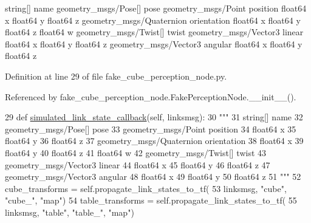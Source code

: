 \begin{DoxyVerb}string[] name
geometry_msgs/Pose[] pose
  geometry_msgs/Point position
    float64 x
    float64 y
    float64 z
  geometry_msgs/Quaternion orientation
    float64 x
    float64 y
    float64 z
    float64 w
geometry_msgs/Twist[] twist
  geometry_msgs/Vector3 linear
    float64 x
    float64 y
    float64 z
  geometry_msgs/Vector3 angular
    float64 x
    float64 y
    float64 z
\end{DoxyVerb}
 

Definition at line 29 of file fake\+\_\+cube\+\_\+perception\+\_\+node.\+py.



Referenced by fake\+\_\+cube\+\_\+perception\+\_\+node.\+Fake\+Perception\+Node.\+\_\+\+\_\+init\+\_\+\+\_\+().


\begin{DoxyCode}
29     \textcolor{keyword}{def }\hyperlink{classfake__cube__perception__node_1_1FakePerceptionNode_ac1127eae8d2eda994b22873529bd198f}{simulated\_link\_state\_callback}(self, linksmsg):
30         \textcolor{stringliteral}{"""}
31 \textcolor{stringliteral}{        string[] name}
32 \textcolor{stringliteral}{        geometry\_msgs/Pose[] pose}
33 \textcolor{stringliteral}{          geometry\_msgs/Point position}
34 \textcolor{stringliteral}{            float64 x}
35 \textcolor{stringliteral}{            float64 y}
36 \textcolor{stringliteral}{            float64 z}
37 \textcolor{stringliteral}{          geometry\_msgs/Quaternion orientation}
38 \textcolor{stringliteral}{            float64 x}
39 \textcolor{stringliteral}{            float64 y}
40 \textcolor{stringliteral}{            float64 z}
41 \textcolor{stringliteral}{            float64 w}
42 \textcolor{stringliteral}{        geometry\_msgs/Twist[] twist}
43 \textcolor{stringliteral}{          geometry\_msgs/Vector3 linear}
44 \textcolor{stringliteral}{            float64 x}
45 \textcolor{stringliteral}{            float64 y}
46 \textcolor{stringliteral}{            float64 z}
47 \textcolor{stringliteral}{          geometry\_msgs/Vector3 angular}
48 \textcolor{stringliteral}{            float64 x}
49 \textcolor{stringliteral}{            float64 y}
50 \textcolor{stringliteral}{            float64 z}
51 \textcolor{stringliteral}{        """}
52         cube\_transforms = self.propagate\_link\_states\_to\_tf(
53             linksmsg, \textcolor{stringliteral}{"cube"}, \textcolor{stringliteral}{"cube\_"}, \textcolor{stringliteral}{"map"})
54         table\_transforms = self.propagate\_link\_states\_to\_tf(
55             linksmsg, \textcolor{stringliteral}{"table"}, \textcolor{stringliteral}{"table\_"}, \textcolor{stringliteral}{"map"})

\end{DoxyCode}
